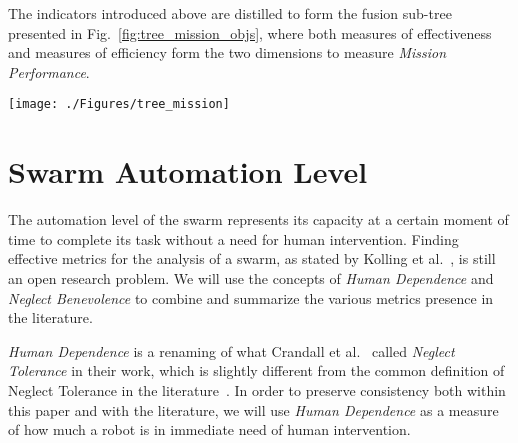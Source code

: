 \documentclass[journal]{IEEEtran}
\begin{document}
The indicators introduced above are distilled to form the fusion sub-tree presented in Fig.~\ref{fig:tree_mission_objs}, where both measures of effectiveness and measures of efficiency form the two dimensions to measure \textit{Mission Performance}.

\begin{figure*}[pt]
\centering
\texttt{[image: ./Figures/tree\_mission]}
\caption{Examples of useful indicators for Mission success.}
\label{fig:tree_mission_objs}
\end{figure*}

\section{Swarm Automation Level}

The automation level of the swarm represents its capacity at a certain moment of time to complete its task without a need for human intervention. Finding effective metrics for the analysis of a swarm, as stated by Kolling et al.~\cite{kolling2016human}, is still an open research problem. We will use the concepts of \textit{Human Dependence} and \textit{Neglect Benevolence} to combine and summarize the various metrics presence in the literature.

\textit{Human Dependence} is a renaming of what Crandall et al.~\cite{crandall2005validating} called \textit{Neglect Tolerance} in their work, which is slightly different from the common definition of Neglect Tolerance in the literature~\cite{olsen2003metrics,crandall2007identifying}. In order to preserve consistency both within this paper and with the literature, we will use \textit{Human Dependence} as a measure of how much a robot is in immediate need of human intervention.
\end{document}
